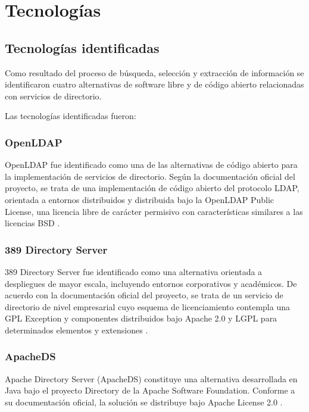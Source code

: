 \section{Tecnologías}\label{sec:tecnologias}

\subsection{Tecnologías identificadas}\label{subsec:tecnologias-identificadas}

Como resultado del proceso de búsqueda, selección y extracción de información se identificaron cuatro alternativas de software libre y de código abierto relacionadas con servicios de directorio.

Las tecnologías identificadas fueron:

\subsubsection{OpenLDAP}

OpenLDAP fue identificado como una de las alternativas de código abierto para la implementación de servicios de directorio. Según la documentación oficial del proyecto, se trata de una implementación de código abierto del protocolo \acs{LDAP}, orientada a entornos distribuidos y distribuida bajo la OpenLDAP Public License, una licencia libre de carácter permisivo con características similares a las licencias BSD \citep{OpenLDAP2026}.

\subsubsection{389 Directory Server}

389 Directory Server fue identificado como una alternativa orientada a despliegues de mayor escala, incluyendo entornos corporativos y académicos. De acuerdo con la documentación oficial del proyecto, se trata de un servicio de directorio de nivel empresarial cuyo esquema de licenciamiento contempla una \acs{GPL} Exception y componentes distribuidos bajo Apache 2.0 y \acs{LGPL} para determinados elementos y extensiones \citep{DS3892026}.

\subsubsection{ApacheDS}

Apache Directory Server (ApacheDS) constituye una alternativa desarrollada en Java bajo el proyecto Directory de la Apache Software Foundation. Conforme a su documentación oficial, la solución se distribuye bajo Apache License 2.0 \citep{ApacheDS2026}.

